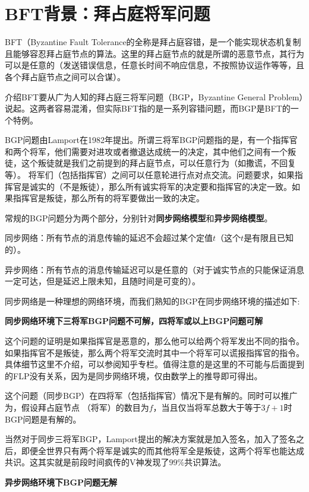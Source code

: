 \section{BFT背景：拜占庭将军问题}
BFT（Byzantine Fault Tolerance的全称是拜占庭容错，是一个能实现状态机复制且能够容忍拜占庭节点的算法。这里的拜占庭节点的就是所谓的恶意节点，其行为可以是任意的（发送错误信息，任意长时间不响应信息，不按照协议运作等等，且各个拜占庭节点之间可以合谋）。

介绍BFT要从广为人知的拜占庭三将军问题（BGP，Byzantine General Problem）说起。这两者容易混淆，但实际BFT指的是一系列容错问题，而BGP是BFT的一个特例。

BGP问题由Lamport在1982年提出\cite{lamport1982byzantine}。所谓三将军BGP问题指的是，有一个指挥官和两个将军，他们需要对进攻或者撤退达成统一的决定，其中他们之间有一个叛徒，这个叛徒就是我们之前提到的拜占庭节点，可以任意行为（如撒谎，不回复等）。
将军们（包括指挥官）之间可以任意轮进行点对点交流。问题要求，如果指挥官是诚实的（不是叛徒），那么所有诚实将军的决定要和指挥官的决定一致。如果指挥官是叛徒，那么所有的将军要做出一致的决定。

常规的BGP问题分为两个部分，分别针对\textbf{同步网络模型}和\textbf{异步网络模型}。

同步网络：所有节点的消息传输的延迟不会超过某个定值$t$（这个$t$是有限且已知的）。

异步网络：所有节点的消息传输延迟可以是任意的（对于诚实节点的只能保证消息一定可达，但是延迟上限未知，且随时间是可变的）。

同步网络是一种理想的网络环境，而我们熟知的BGP在同步网络环境的描述如下:

\textbf{同步网络环境下三将军BGP问题不可解，四将军或以上BGP问题可解}

这个问题的证明是如果指挥官是恶意的，那么他可以给两个将军发出不同的指令。如果指挥官不是叛徒，那么两个将军交流时其中一个将军可以谎报指挥官的指令。具体细节这里不介绍，可以参阅知乎专栏\cite{zhihuBFT}。值得注意的是这里的不可能与后面提到的FLP没有关系，因为是同步网络环境，仅由数学上的推导即可得出。

这个问题（同步BGP）在四将军（包括指挥官）情况下是有解的。同时可以推广为，假设拜占庭节点 （将军）的数目为$f$，当且仅当将军总数大于等于$3f+1$时BGP问题是有解的。

当然对于同步三将军BGP，Lamport提出的解决方案就是加入签名\cite{lamport1979constructing}，加入了签名之后，即便全世界只有两个将军是诚实的而其他将军全是叛徒，这两个将军也能达成共识。这其实就是前段时间疯传的V神发现了$99\%$共识算法。

\textbf{异步网络环境下BGP问题无解}

